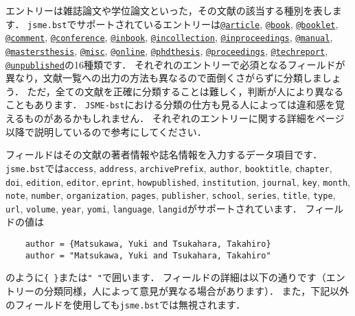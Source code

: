 \documentclass[a4paper,fleqn,uplatex,dvipdfmx]{jsarticle}
\makeatletter
\newcommand{\jsmefile}{\texttt{jsme.bst}}
\newcommand{\JSMErepos}{\texttt{JSME-bst}}
\newcommand{\ttarticle}{\texttt{@article}}
\newcommand{\ttbooklet}{\texttt{@booklet}}
\newcommand{\ttcomment}{\texttt{@comment}}
\newcommand{\ttconference}{\texttt{@conference}}
\newcommand{\ttinbook}{\texttt{@inbook}}
\newcommand{\ttincollection}{\texttt{@incollection}}
\newcommand{\ttinproceedings}{\texttt{@inproceedings}}
\newcommand{\ttmanual}{\texttt{@manual}}
\newcommand{\ttmastersthesis}{\texttt{@mastersthesis}}
\newcommand{\ttmisc}{\texttt{@misc}}
\newcommand{\ttonline}{\texttt{@online}}
\newcommand{\ttphdthesis}{\texttt{@phdthesis}}
\newcommand{\ttproceedings}{\texttt{@proceedings}}
\newcommand{\tttechreport}{\texttt{@techreport}}
\newcommand{\ttunpublished}{\texttt{@unpublished}}
\makeatother
\begin{document}
エントリーは雑誌論文や学位論文といった，その文献の該当する種別を表します．
\jsmefile でサポートされているエントリーは\hyperref[ssec:article]{\ttarticle}, \hyperref[ssec:book]{\texttt{@book}}, \hyperref[ssec:booklet]{\ttbooklet}, \hyperref[ssec:comment]{\ttcomment}, \hyperref[ssec:conference]{\ttconference}, \hyperref[ssec:inbook]{\ttinbook}, \hyperref[ssec:incollection]{\ttincollection}, \hyperref[ssec:inproceedings]{\ttinproceedings}, \hyperref[ssec:manual]{\ttmanual}, \hyperref[ssec:mastersthesis]{\ttmastersthesis}, \hyperref[ssec:misc]{\ttmisc}, \hyperref[ssec:online]{\ttonline}, \hyperref[ssec:phdthesis]{\ttphdthesis}, \hyperref[ssec:proceedings]{\ttproceedings}, \hyperref[ssec:techreport]{\tttechreport}, \hyperref[ssec:unpublished]{\ttunpublished}の16種類です．
それぞれのエントリーで必須となるフィールドが異なり，文献一覧への出力の方法も異なるので面倒くさがらずに分類しましょう．
ただ，全ての文献を正確に分類することは難しく，判断が人により異なることもあります．
\JSMErepos における分類の仕方も見る人によっては違和感を覚えるものがあるかもしれません．
それぞれのエントリーに関する詳細を\pageref{ssec:article}ページ以降で説明しているので参考にしてください．

フィールドはその文献の著者情報や誌名情報を入力するデータ項目です．
\jsmefile では\verb|access|, \verb|address|, \verb|archivePrefix|, \verb|author|, \verb|booktitle|, \verb|chapter|, \verb|doi|, \verb|edition|, \verb|editor|, \verb|eprint|, \verb|howpublished|, \verb|institution|, \verb|journal|, \verb|key|, \verb|month|, \verb|note|, \verb|number|, \verb|organization|, \verb|pages|, \verb|publisher|, \verb|school|, \verb|series|, \verb|title|, \verb|type|, \verb|url|, \verb|volume|, \verb|year|, \verb|yomi|, \verb|language|, \verb|langid|がサポートされています．
フィールドの値は
\begin{verbatim}
    author = {Matsukawa, Yuki and Tsukahara, Takahiro}
    author = "Matsukawa, Yuki and Tsukahara, Takahiro"
\end{verbatim}
のように\verb|{ }|または\verb|" "|で囲います．
フィールドの詳細は以下の通りです（エントリーの分類同様，人によって意見が異なる場合があります）．
また，下記以外のフィールドを使用しても\jsmefile では無視されます．
\end{document}
